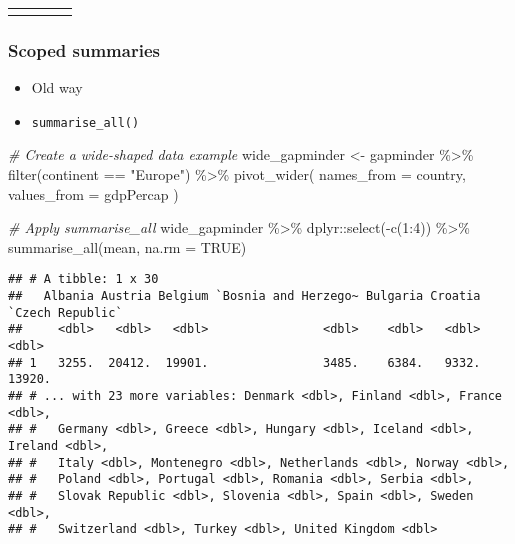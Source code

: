 \documentclass[
]{book}
\newenvironment{Shaded}{\begin{snugshade}}{\end{snugshade}}
\newcommand{\AttributeTok}[1]{\textcolor[rgb]{0.77,0.63,0.00}{#1}}
\newcommand{\CommentTok}[1]{\textcolor[rgb]{0.56,0.35,0.01}{\textit{#1}}}
\newcommand{\ConstantTok}[1]{\textcolor[rgb]{0.00,0.00,0.00}{#1}}
\newcommand{\DecValTok}[1]{\textcolor[rgb]{0.00,0.00,0.81}{#1}}
\newcommand{\FunctionTok}[1]{\textcolor[rgb]{0.00,0.00,0.00}{#1}}
\newcommand{\NormalTok}[1]{#1}
\newcommand{\OtherTok}[1]{\textcolor[rgb]{0.56,0.35,0.01}{#1}}
\newcommand{\SpecialCharTok}[1]{\textcolor[rgb]{0.00,0.00,0.00}{#1}}
\newcommand{\StringTok}[1]{\textcolor[rgb]{0.31,0.60,0.02}{#1}}
\begin{document}
\begin{longtable}[c]{|p{0.75in}|p{0.75in}|p{0.75in}|p{0.75in}}
\noalign{\global\setlength{\arrayrulewidth}{2pt}}\arrayrulecolor[HTML]{666666}\cline{1-4}

\end{longtable}

\hypertarget{scoped-summaries}{%
\subsubsection{Scoped summaries}\label{scoped-summaries}}

\begin{itemize}
\item
  Old way
\item
  \texttt{summarise\_all()}
\end{itemize}

\begin{Shaded}
\begin{Highlighting}[]
\CommentTok{\# Create a wide{-}shaped data example}
\NormalTok{wide\_gapminder }\OtherTok{\textless{}{-}}\NormalTok{ gapminder }\SpecialCharTok{\%\textgreater{}\%}
  \FunctionTok{filter}\NormalTok{(continent }\SpecialCharTok{==} \StringTok{"Europe"}\NormalTok{) }\SpecialCharTok{\%\textgreater{}\%}
  \FunctionTok{pivot\_wider}\NormalTok{(}
    \AttributeTok{names\_from =}\NormalTok{ country,}
    \AttributeTok{values\_from =}\NormalTok{ gdpPercap}
\NormalTok{  )}

\CommentTok{\# Apply summarise\_all}
\NormalTok{wide\_gapminder }\SpecialCharTok{\%\textgreater{}\%}
\NormalTok{  dplyr}\SpecialCharTok{::}\FunctionTok{select}\NormalTok{(}\SpecialCharTok{{-}}\FunctionTok{c}\NormalTok{(}\DecValTok{1}\SpecialCharTok{:}\DecValTok{4}\NormalTok{)) }\SpecialCharTok{\%\textgreater{}\%}
  \FunctionTok{summarise\_all}\NormalTok{(mean, }\AttributeTok{na.rm =} \ConstantTok{TRUE}\NormalTok{)}
\end{Highlighting}
\end{Shaded}

\begin{verbatim}
## # A tibble: 1 x 30
##   Albania Austria Belgium `Bosnia and Herzego~ Bulgaria Croatia `Czech Republic`
##     <dbl>   <dbl>   <dbl>                <dbl>    <dbl>   <dbl>            <dbl>
## 1   3255.  20412.  19901.                3485.    6384.   9332.           13920.
## # ... with 23 more variables: Denmark <dbl>, Finland <dbl>, France <dbl>,
## #   Germany <dbl>, Greece <dbl>, Hungary <dbl>, Iceland <dbl>, Ireland <dbl>,
## #   Italy <dbl>, Montenegro <dbl>, Netherlands <dbl>, Norway <dbl>,
## #   Poland <dbl>, Portugal <dbl>, Romania <dbl>, Serbia <dbl>,
## #   Slovak Republic <dbl>, Slovenia <dbl>, Spain <dbl>, Sweden <dbl>,
## #   Switzerland <dbl>, Turkey <dbl>, United Kingdom <dbl>
\end{verbatim}
\end{document}
